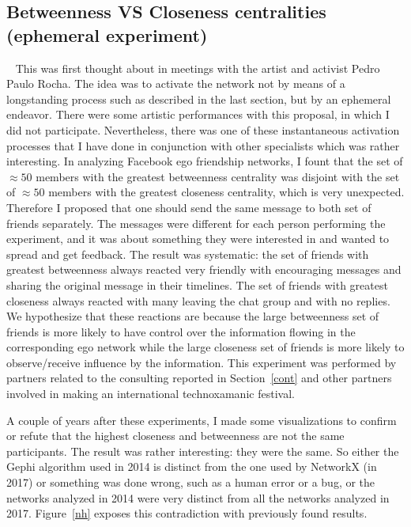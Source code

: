 \documentclass[a4paper]{article}
\begin{document}


\subsection{Betweenness VS Closeness centralities (ephemeral experiment)}~\label{eph}
This was first thought about in meetings with the artist and activist Pedro Paulo Rocha.
The idea was to activate the network not by means of a longstanding process such
as described in the last section, but by an ephemeral endeavor.
There were some artistic performances with this proposal, in which I did
not participate.
Nevertheless, there was one of these instantaneous activation processes that
I have done in conjunction with other specialists which was rather interesting.
In analyzing Facebook ego friendship networks, I fount that the set of $\approx 50$ members with
the greatest betweenness centrality was disjoint with the set of $\approx 50$ members
with the greatest closeness centrality, which is very unexpected.
Therefore I proposed that one should send the same message to both set of friends separately.
The messages were different for each person performing the experiment,
and it was about something they were interested in and wanted to spread and get feedback.
The result was systematic: the set of friends with greatest betweenness always reacted very friendly
with encouraging messages and sharing the original message in their timelines.
The set of friends with greatest closeness always reacted with many leaving the chat group
and with no replies.
We hypothesize that these reactions are because the large betweenness set of friends is more
likely to have control over the information flowing in the corresponding ego network while
the large closeness set of friends is more likely to observe/receive influence by the information.
This experiment was performed by partners related to the consulting reported in Section~\ref{cont}
and other partners involved in making an international technoxamanic festival.

A couple of years after these experiments, I made some visualizations to confirm or refute
that the highest closeness and betweenness are not the same participants.
The result was rather interesting: they were the same.
So either the Gephi algorithm used in 2014 is distinct from the one used by
NetworkX (in 2017) or something was done wrong, such as a human error or a bug,
or the networks analyzed in 2014 were very distinct from all the networks analyzed in 2017.
Figure~\ref{nh} exposes this contradiction with previously found results.
\end{document}
